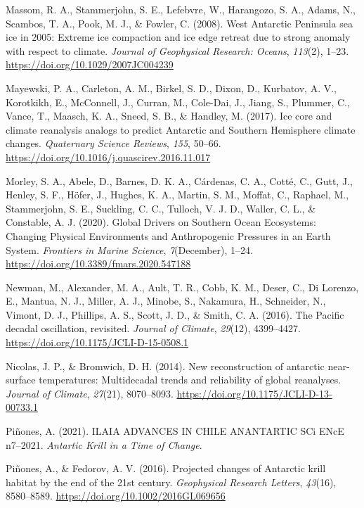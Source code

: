\documentclass[
]{article}
\newlength{\cslhangindent}
\newenvironment{cslreferences}%
  {\setlength{\parindent}{0pt}%
  \everypar{\setlength{\hangindent}{\cslhangindent}}\ignorespaces}%
  {\par}
\begin{document}
\begin{cslreferences}
\leavevmode\hypertarget{ref-Massom2008}{}%
Massom, R. A., Stammerjohn, S. E., Lefebvre, W., Harangozo, S. A.,
Adams, N., Scambos, T. A., Pook, M. J., \& Fowler, C. (2008). West
Antarctic Peninsula sea ice in 2005: Extreme ice compaction and ice edge
retreat due to strong anomaly with respect to climate. \emph{Journal of
Geophysical Research: Oceans}, \emph{113}(2), 1--23.
\url{https://doi.org/10.1029/2007JC004239}

\leavevmode\hypertarget{ref-Mayewski2017}{}%
Mayewski, P. A., Carleton, A. M., Birkel, S. D., Dixon, D., Kurbatov, A.
V., Korotkikh, E., McConnell, J., Curran, M., Cole-Dai, J., Jiang, S.,
Plummer, C., Vance, T., Maasch, K. A., Sneed, S. B., \& Handley, M.
(2017). Ice core and climate reanalysis analogs to predict Antarctic and
Southern Hemisphere climate changes. \emph{Quaternary Science Reviews},
\emph{155}, 50--66.
\url{https://doi.org/10.1016/j.quascirev.2016.11.017}

\leavevmode\hypertarget{ref-Morley2020}{}%
Morley, S. A., Abele, D., Barnes, D. K. A., Cárdenas, C. A., Cotté, C.,
Gutt, J., Henley, S. F., Höfer, J., Hughes, K. A., Martin, S. M.,
Moffat, C., Raphael, M., Stammerjohn, S. E., Suckling, C. C., Tulloch,
V. J. D., Waller, C. L., \& Constable, A. J. (2020). Global Drivers on
Southern Ocean Ecosystems: Changing Physical Environments and
Anthropogenic Pressures in an Earth System. \emph{Frontiers in Marine
Science}, \emph{7}(December), 1--24.
\url{https://doi.org/10.3389/fmars.2020.547188}

\leavevmode\hypertarget{ref-Newman2016}{}%
Newman, M., Alexander, M. A., Ault, T. R., Cobb, K. M., Deser, C., Di
Lorenzo, E., Mantua, N. J., Miller, A. J., Minobe, S., Nakamura, H.,
Schneider, N., Vimont, D. J., Phillips, A. S., Scott, J. D., \& Smith,
C. A. (2016). The Pacific decadal oscillation, revisited. \emph{Journal
of Climate}, \emph{29}(12), 4399--4427.
\url{https://doi.org/10.1175/JCLI-D-15-0508.1}

\leavevmode\hypertarget{ref-Nicolas2014}{}%
Nicolas, J. P., \& Bromwich, D. H. (2014). New reconstruction of
antarctic near-surface temperatures: Multidecadal trends and reliability
of global reanalyses. \emph{Journal of Climate}, \emph{27}(21),
8070--8093. \url{https://doi.org/10.1175/JCLI-D-13-00733.1}

\leavevmode\hypertarget{ref-ILAIA2021}{}%
Piñones, A. (2021). ILAIA ADVANCES IN CHILE ANANTARTIC SCi ENcE
n7--2021. \emph{Antartic Krill in a Time of Change}.

\leavevmode\hypertarget{ref-Pinones2016}{}%
Piñones, A., \& Fedorov, A. V. (2016). Projected changes of Antarctic
krill habitat by the end of the 21st century. \emph{Geophysical Research
Letters}, \emph{43}(16), 8580--8589.
\url{https://doi.org/10.1002/2016GL069656}


\end{cslreferences}
\end{document}
